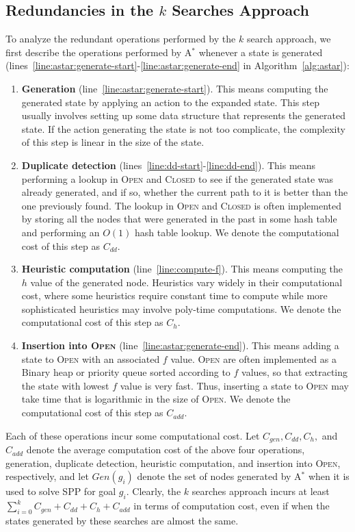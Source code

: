 \documentclass{aicom2e}
\newcommand{\astar}{A$^*$}
\newcommand{\open}{\textsc{Open}}
\newcommand{\closed}{\textsc{Closed}}
\begin{document}
\subsection{Redundancies in the $k$ Searches Approach}

To analyze the redundant operations performed by the $k$ search approach, we first describe the operations performed by \astar{} whenever a state is generated (lines~\ref{line:astar:generate-start}-\ref{line:astar:generate-end} in Algorithm~\ref{alg:astar}):
\begin{enumerate}
\item {\bf Generation}  (line~\ref{line:astar:generate-start}). This means computing the generated state by applying 
an action to the expanded state. This step usually involves setting up some data structure that represents the generated state. If the action generating the state is not too complicate, the complexity of this step is linear in the size of the state. 
\item {\bf Duplicate detection}  (lines~\ref{line:dd-start}-\ref{line:dd-end}). This means performing a lookup in \open{} and \closed{} to see if the generated state was already generated, and if so, whether the current path to it is better than the one previously found. The lookup in \open{} and \closed{} is often implemented by storing all the nodes that were generated in the past in some hash table and performing an $O(1)$ hash table lookup. We denote the computational cost of this step as $C_{dd}$. 
\item {\bf Heuristic computation}  (line~\ref{line:compute-f}). This means computing the $h$ value of the generated node. Heuristics vary widely in their computational cost, where some heuristics require constant time to compute while more sophisticated heuristics may involve poly-time computations. We denote the computational cost of this step as $C_{h}$. 
\item {\bf Insertion into \open{}}  (line~\ref{line:astar:generate-end}). This means adding a state to \open{} with an associated $f$ value. \open{} are often implemented as a Binary heap or priority queue sorted according to $f$ values, so that extracting the state with lowest $f$ value is very fast. Thus, inserting a state to \open{} may take time that is logarithmic in the size of \open{}. We denote the computational cost of this step as $C_{add}$.  
\end{enumerate}
Each of these operations incur some computational cost. Let $C_{gen}, C_{dd}, C_{h},$ and $C_{add}$ denote the average computation cost 
of the above four operations, generation, duplicate detection, heuristic computation, and insertion into \open{}, respectively, 
and let $Gen(g_i)$ denote the set of nodes generated by \astar{} when it is used to solve SPP for goal $g_i$.  
Clearly, the $k$ searches approach incurs at least $\sum_{i=0}^k C_{gen}+C_{dd}+C_{h}+C_{add}$ in terms of computation cost, 
even if when the states generated by these searches are almost the same. 
\end{document}
